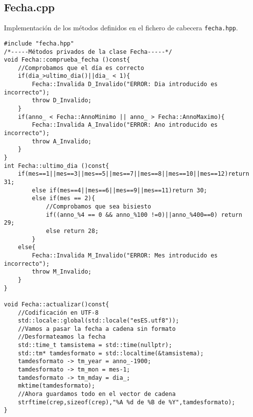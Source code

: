\subsection{Fecha.cpp}
Implementación de los métodos definidos en el fichero de cabecera \texttt{fecha.hpp}.
\begin{verbatim}
#include "fecha.hpp"
/*-----Métodos privados de la clase Fecha-----*/
void Fecha::comprueba_fecha ()const{
    //Comprobamos que el día es correcto
    if(dia_>ultimo_dia()||dia_ < 1){
        Fecha::Invalida D_Invalido("ERROR: Dia introducido es incorrecto");
        throw D_Invalido;
    }
    if(anno_ < Fecha::AnnoMinimo || anno_ > Fecha::AnnoMaximo){
        Fecha::Invalida A_Invalido("ERROR: Ano introducido es incorrecto");
        throw A_Invalido;
    }
}
int Fecha::ultimo_dia ()const{
    if(mes==1||mes==3||mes==5||mes==7||mes==8||mes==10||mes==12)return 31;
        else if(mes==4||mes==6||mes==9||mes==11)return 30;
        else if(mes == 2){
            //Comprobamos que sea bisiesto
            if((anno_%4 == 0 && anno_%100 !=0)||anno_%400==0) return 29;
            else return 28;
        }
    else{
        Fecha::Invalida M_Invalido("ERROR: Mes introducido es incorrecto");
        throw M_Invalido;
    } 
}

void Fecha::actualizar()const{
    //Codificación en UTF-8
    std::locale::global(std::locale("esES.utf8"));
    //Vamos a pasar la fecha a cadena sin formato
    //Desformateamos la fecha
    std::time_t tamsistema = std::time(nullptr);
    std::tm* tamdesformato = std::localtime(&tamsistema);
    tamdesformato -> tm_year = anno_-1900;
    tamdesformato -> tm_mon = mes-1;
    tamdesformato -> tm_mday = dia_;
    mktime(tamdesformato);
    //Ahora guardamos todo en el vector de cadena
    strftime(crep,sizeof(crep),"%A %d de %B de %Y",tamdesformato);
}


\end{verbatim}
